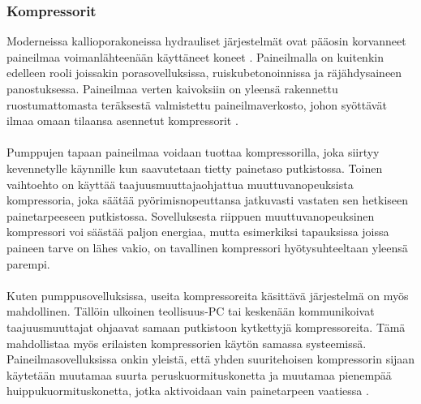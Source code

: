 \documentclass[finnish,12pt,a4paper,pdftex,elec,utf8]{aaltothesis}
\begin{document}
\subsubsection{Kompressorit}
Moderneissa kallioporakoneissa hydrauliset järjestelmät ovat pääosin korvanneet paineilmaa voimanlähteenään käyttäneet koneet \cite[s. 143]{Hakapää}. Paineilmalla on kuitenkin edelleen rooli joissakin porasovelluksissa, ruiskubetonoinnissa ja räjähdysaineen panostuksessa. Paineilmaa verten kaivoksiin on yleensä rakennettu ruostumattomasta teräksestä valmistettu paineilmaverkosto, johon syöttävät ilmaa omaan tilaansa asennetut kompressorit \cite[s. 269]{Hakapää}.
\\\\
Pumppujen tapaan paineilmaa voidaan tuottaa kompressorilla, joka siirtyy kevennetylle käynnille kun saavutetaan tietty painetaso putkistossa. Toinen vaihtoehto on käyttää taajuusmuuttajaohjattua muuttuvanopeuksista kompressoria, joka säätää pyörimisnopeuttansa jatkuvasti vastaten sen hetkiseen painetarpeeseen putkistossa. \cite[s. 269]{Hakapää} Sovelluksesta riippuen muuttuvanopeuksinen kompressori voi säästää paljon energiaa, mutta esimerkiksi tapauksissa joissa paineen tarve on lähes vakio, on tavallinen kompressori hyötysuhteeltaan yleensä parempi.
\\\\
Kuten pumppusovelluksissa, useita kompressoreita käsittävä järjestelmä on myös mahdollinen. Tällöin ulkoinen teollisuus-PC tai keskenään kommunikoivat taajuusmuuttajat ohjaavat samaan putkistoon kytkettyjä kompressoreita. Tämä mahdollistaa myös erilaisten kompressorien käytön samassa systeemissä. Paineilmasovelluksissa onkin yleistä, että yhden suuritehoisen kompressorin sijaan käytetään muutamaa suurta peruskuormituskonetta ja muutamaa pienempää huippukuormituskonetta, jotka aktivoidaan vain painetarpeen vaatiessa \cite[s. 269]{Hakapää}.
\clearpage
\end{document}
